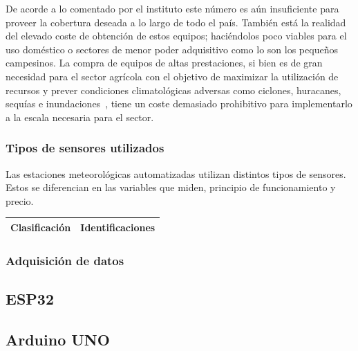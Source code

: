 \documentclass[12pt,letterpaper]{article}
\begin{document}
\begin{sloppypar}
        De acorde a lo comentado por el instituto este número es aún
        insuficiente para
        proveer la cobertura deseada a lo largo de todo el país.
        También está la realidad del elevado coste de obtención de estos
        equipos;
        haciéndolos poco viables para el uso doméstico o sectores de menor poder
        adquisitivo como lo son los pequeños campesinos.
        La compra de equipos de altas prestaciones, si bien es de gran
        necesidad para
        el
        sector agrícola con el objetivo de maximizar la utilización de
        recursos y
        prever condiciones climatológicas adversas como ciclones, huracanes,
        sequías e
        inundaciones~\cite{vantilburgExtremeWeatherEvents2022}, tiene un coste
        demasiado
        prohibitivo para implementarlo a la escala necesaria para el sector.

        \subsubsection{Tipos de sensores utilizados}
        Las estaciones meteorológicas automatizadas utilizan distintos tipos de
        sensores.
        Estos se diferencian en las variables que miden, principio de
        funcionamiento y
        precio.

        \begin{table}
            \begin{tabularx}{\linewidth}{|X|X|}
                \hline
                Clasificación & Identificaciones \\

                \hline
                \hline
            \end{tabularx}
        \end{table}

        \subsubsection{Adquisición de datos}

        \subsection{ESP32}

        \subsection{Arduino UNO}

        \newpage



\end{sloppypar}
\end{document}
